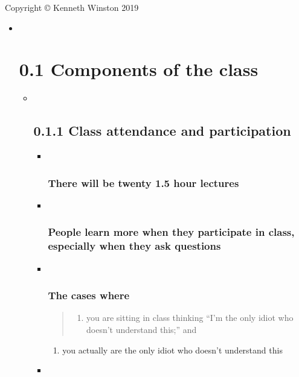 \documentclass[11pt]{article}
\providecommand{\tightlist}{%
      \setlength{\itemsep}{0pt}\setlength{\parskip}{0pt}}
\begin{document}
Copyright © Kenneth Winston 2019

    \begin{itemize}
\item ~
  \section{\texorpdfstring{{0.1 Components of the
  class}}{0.1 Components of the class}}\label{components-of-the-class}

  \begin{itemize}
  \item ~
    \subsection{\texorpdfstring{{0.1.1 Class attendance and
    participation}}{0.1.1 Class attendance and participation}}\label{class-attendance-and-participation}

    \begin{itemize}
    \item ~
      \subsubsection{There will be twenty 1.5 hour
      lectures}\label{there-will-be-twenty-1.5-hour-lectures}
    \item ~
      \subsubsection{People learn more when they participate in class,
      especially when they ask
      questions}\label{people-learn-more-when-they-participate-in-class-especially-when-they-ask-questions}
    \item ~
      \subsubsection{The cases where}\label{the-cases-where}

      \begin{quote}
      \begin{enumerate}
      \def\labelenumi{(\alph{enumi})}
      \tightlist
      \item
        you are sitting in class thinking ``I'm the only idiot who
        doesn't understand this;'' and
      \end{enumerate}
      \end{quote}

      \begin{enumerate}
      \def\labelenumi{(\alph{enumi})}
      \setcounter{enumi}{1}
      \tightlist
      \item
        you actually are the only idiot who doesn't understand this
      \end{enumerate}
    \item ~

\end{itemize}
\end{itemize}
\end{itemize}
\end{document}

